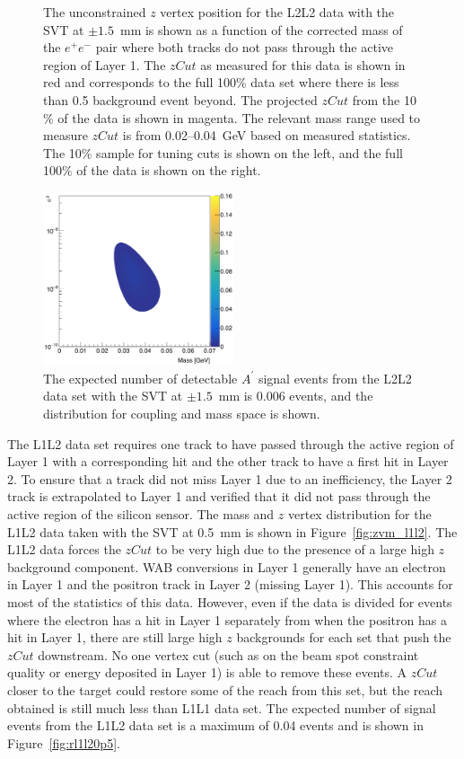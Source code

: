 \begin{figure}[hbt]
  \caption[$z$ vertex and mass distribution for the L2L2 data set with the SVT at $\pm1.5$~mm]{The unconstrained $z$ vertex position for the L2L2 data with the SVT at $\pm1.5$~mm is shown as a function of the corrected mass of the $e^+e^-$ pair where both tracks do not pass through the active region of Layer 1. The $zCut$ as measured for this data is shown in red and corresponds to the full 100$\%$ data set where there is less than 0.5 background event beyond. The projected $zCut$ from the 10$\%$ of the data is shown in magenta. The relevant mass range used to measure $zCut$ is from 0.02--0.04~GeV based on measured statistics. The 10$\%$ sample for tuning cuts is shown on the left, and the full 100$\%$ of the data is shown on the right.}
  \label{fig:zvm_l2l2_1p5}
\end{figure}
\begin{figure}[htb]
  \centering
      \includegraphics[width=0.5\textwidth]{pics/appendix/reachL2L2_1p5.png}
  \caption[Expected detectable $A^{\prime}$ signal yield from the L2L2 data at 1.5~mm]{The expected number of detectable $A^{\prime}$ signal events from the L2L2 data set with the SVT at $\pm1.5$~mm is 0.006 events, and the distribution for coupling and mass space is shown.}
  \label{fig:rl2l21p5}
\end{figure} 
The L1L2 data set requires one track to have passed through the active region of Layer 1 with a corresponding hit and the other track to have a first hit in Layer 2. To ensure that a track did not miss Layer 1 due to an inefficiency, the Layer 2 track is extrapolated to Layer 1 and verified that it did not pass through the active region of the silicon sensor. The mass and $z$ vertex distribution for the L1L2 data taken with the SVT at 0.5~mm is shown in Figure~\ref{fig:zvm_l1l2}. The L1L2 data forces the $zCut$ to be very high due to the presence of a large high $z$ background component. WAB conversions in Layer 1 generally have an electron in Layer 1 and the positron track in Layer 2 (missing Layer 1). This accounts for most of the statistics of this data. However, even if the data is divided for events where the electron has a hit in Layer 1 separately from when the positron has a hit in Layer 1, there are still large high $z$ backgrounds for each set that push the $zCut$ downstream. No one vertex cut (such as on the beam spot constraint quality or energy deposited in Layer 1) is able to remove these events. A $zCut$ closer to the target could restore some of the reach from this set, but the reach obtained is still much less than L1L1 data set. The expected number of signal events from the L1L2 data set is a maximum of 0.04 events and is shown in Figure~\ref{fig:rl1l20p5}.\\
